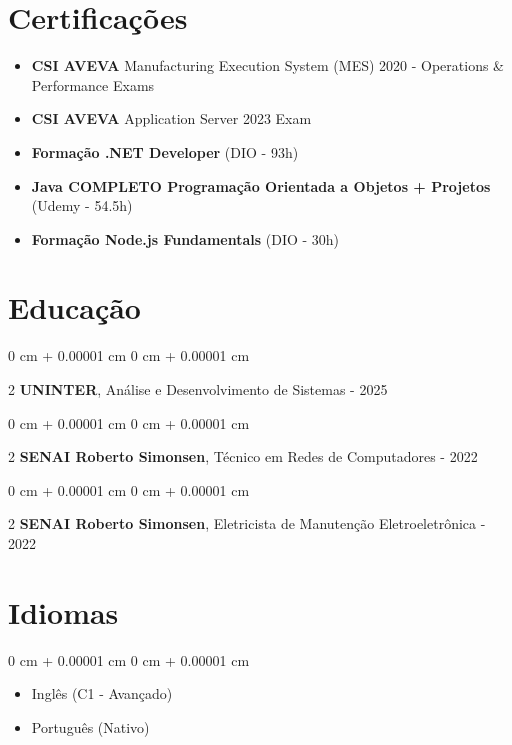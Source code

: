 \documentclass[10pt, letterpaper]{article}
\newenvironment{highlights}{ \begin{itemize}[ topsep=0.10 cm, parsep=0.10 cm, partopsep=0pt,
itemsep=0pt, leftmargin=0 cm + 10pt ] }{ \end{itemize} } %
\newenvironment{onecolentry}{ \begin{adjustwidth}{ 0 cm + 0.00001 cm }{ 0 cm + 0.00001 cm }
}{ \end{adjustwidth} } %
\newenvironment{twocolentry}[2][]{ \onecolentry \def\secondColumn{#2} \setcolumnwidth{\fill, 4.5 cm}
\begin{paracol}{2} }{ \switchcolumn \raggedleft \secondColumn \end{paracol}
\endonecolentry } %
\begin{document}
    \section{Certificações}
    
    \begin{highlights}
        \item \textbf{CSI AVEVA} Manufacturing Execution System (MES) 2020 - Operations \& Performance Exams
        \item \textbf{CSI AVEVA} Application Server 2023 Exam
        \item \textbf{Formação .NET Developer} (DIO - 93h)
        \item \textbf{Java COMPLETO Programação Orientada a Objetos + Projetos} (Udemy - 54.5h)
        \item \textbf{Formação Node.js Fundamentals} (DIO - 30h)
    \end{highlights}

	\section{Educação}
	
	\begin{twocolentry}
		{2023 - 2025} \textbf{UNINTER}, Análise e Desenvolvimento de Sistemas
	\end{twocolentry}
	
	\begin{twocolentry}
		{2021 -  2022} \textbf{SENAI Roberto Simonsen}, Técnico em Redes de Computadores
	\end{twocolentry}

    \begin{twocolentry}
		{2020 -  2022} \textbf{SENAI Roberto Simonsen}, Eletricista de Manutenção Eletroeletrônica
	\end{twocolentry}
	
	\section{Idiomas}
	
	\begin{onecolentry}
		\begin{highlights}
			\item Inglês (C1 - Avançado)
			\item Português (Nativo)
		\end{highlights}
	\end{onecolentry}
	
\end{document}
